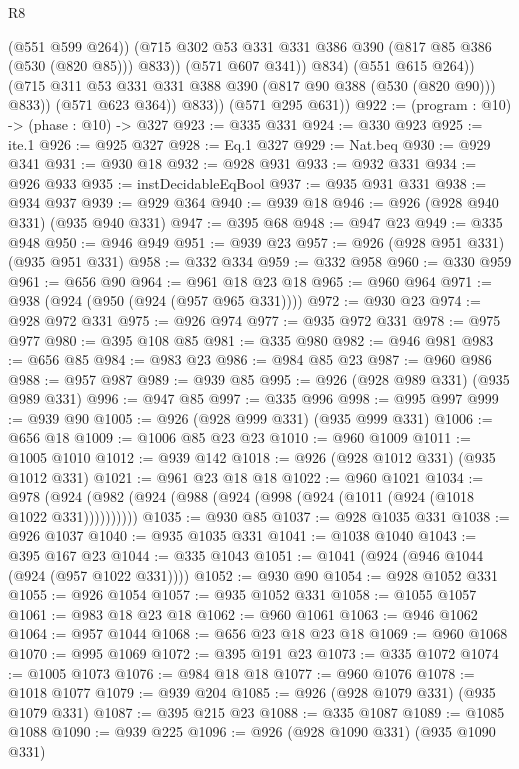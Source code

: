 \begin{lexlean}{R8}
\begin{coremodule}
                        (@551 @599 @264))
                      (@715 @302 @53 @331 @331 @386 @390 (@817 @85 @386 (@530 (@820 @85))) @833))
                    (@571 @607 @341))
                  @834)
                (@551 @615 @264))
              (@715 @311 @53 @331 @331 @388 @390 (@817 @90 @388 (@530 (@820 @90))) @833))
            (@571 @623 @364))
          @833))
      (@571 @295 @631))
@922 := (program : @10) -> (phase : @10) -> @327
@923 := @335 @331
@924 := @330 @923
@925 := ite.{1}
@926 := @925 @327
@928 := Eq.{1} @327
@929 := Nat.beq
@930 := @929 @341
@931 := @930 @18
@932 := @928 @931
@933 := @932 @331
@934 := @926 @933
@935 := instDecidableEqBool
@937 := @935 @931 @331
@938 := @934 @937
@939 := @929 @364
@940 := @939 @18
@946 := @926 (@928 @940 @331) (@935 @940 @331)
@947 := @395 @68
@948 := @947 @23
@949 := @335 @948
@950 := @946 @949
@951 := @939 @23
@957 := @926 (@928 @951 @331) (@935 @951 @331)
@958 := @332 @334
@959 := @332 @958
@960 := @330 @959
@961 := @656 @90
@964 := @961 @18 @23 @18
@965 := @960 @964
@971 := @938 (@924 (@950 (@924 (@957 @965 @331))))
@972 := @930 @23
@974 := @928 @972 @331
@975 := @926 @974
@977 := @935 @972 @331
@978 := @975 @977
@980 := @395 @108 @85
@981 := @335 @980
@982 := @946 @981
@983 := @656 @85
@984 := @983 @23
@986 := @984 @85 @23
@987 := @960 @986
@988 := @957 @987
@989 := @939 @85
@995 := @926 (@928 @989 @331) (@935 @989 @331)
@996 := @947 @85
@997 := @335 @996
@998 := @995 @997
@999 := @939 @90
@1005 := @926 (@928 @999 @331) (@935 @999 @331)
@1006 := @656 @18
@1009 := @1006 @85 @23 @23
@1010 := @960 @1009
@1011 := @1005 @1010
@1012 := @939 @142
@1018 := @926 (@928 @1012 @331) (@935 @1012 @331)
@1021 := @961 @23 @18 @18
@1022 := @960 @1021
@1034 := @978 (@924 (@982 (@924 (@988 (@924 (@998 (@924 (@1011 (@924 (@1018 @1022 @331))))))))))
@1035 := @930 @85
@1037 := @928 @1035 @331
@1038 := @926 @1037
@1040 := @935 @1035 @331
@1041 := @1038 @1040
@1043 := @395 @167 @23
@1044 := @335 @1043
@1051 := @1041 (@924 (@946 @1044 (@924 (@957 @1022 @331))))
@1052 := @930 @90
@1054 := @928 @1052 @331
@1055 := @926 @1054
@1057 := @935 @1052 @331
@1058 := @1055 @1057
@1061 := @983 @18 @23 @18
@1062 := @960 @1061
@1063 := @946 @1062
@1064 := @957 @1044
@1068 := @656 @23 @18 @23 @18
@1069 := @960 @1068
@1070 := @995 @1069
@1072 := @395 @191 @23
@1073 := @335 @1072
@1074 := @1005 @1073
@1076 := @984 @18 @18
@1077 := @960 @1076
@1078 := @1018 @1077
@1079 := @939 @204
@1085 := @926 (@928 @1079 @331) (@935 @1079 @331)
@1087 := @395 @215 @23
@1088 := @335 @1087
@1089 := @1085 @1088
@1090 := @939 @225
@1096 := @926 (@928 @1090 @331) (@935 @1090 @331)

\end{coremodule}
\end{lexlean}
